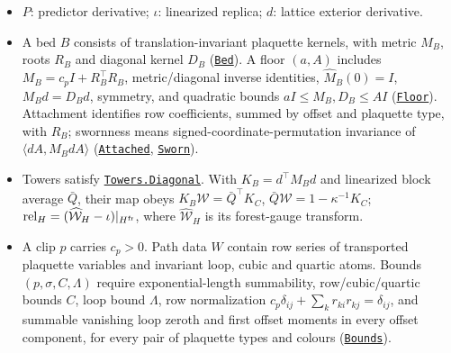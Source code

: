 \documentclass[
  letterpaper,
  11pt]{article}
\providecommand{\tightlist}{%
  \setlength{\itemsep}{0pt}\setlength{\parskip}{0pt}}
\begin{document}
\begin{itemize}
\tightlist
\item
  \(P\): predictor derivative; \(\iota\): linearized replica; \(d\):
  lattice exterior derivative.
\item
  A bed \(B\) consists of translation-invariant plaquette kernels, with
  metric \(M_B\), roots \(R_B\) and diagonal kernel \(D_B\)
  (\href{https://github.com/yang-mills-group/OpenAI-YM-20261028/blob/3456e5e75cf8d4cd558955a5c7638fba2d68f464/YM/PREC/Stacks.lean\#L35-L40}{\texttt{Bed}}).
  A floor \((a,A)\) includes \(M_B=c_pI+R_B^\top R_B\), metric/diagonal
  inverse identities, \(\widehat M_B(0)=I\), \(M_Bd=D_Bd\), symmetry,
  and quadratic bounds \(aI\le M_B,D_B\le AI\)
  (\href{https://github.com/yang-mills-group/OpenAI-YM-20261028/blob/3456e5e75cf8d4cd558955a5c7638fba2d68f464/YM/PREC/Stacks.lean\#L61-L68}{\texttt{Floor}}).
  Attachment identifies row coefficients, summed by offset and plaquette
  type, with \(R_B\); swornness means signed-coordinate-permutation
  invariance of \(\langle dA,M_BdA\rangle\)
  (\href{https://github.com/yang-mills-group/OpenAI-YM-20261028/blob/3456e5e75cf8d4cd558955a5c7638fba2d68f464/YM/PREC/Stacks.lean\#L44-L46}{\texttt{Attached}},
  \href{https://github.com/yang-mills-group/OpenAI-YM-20261028/blob/3456e5e75cf8d4cd558955a5c7638fba2d68f464/YM/Bid/Station.lean\#L54-L55}{\texttt{Sworn}}).
\item
  Towers satisfy
  \href{https://github.com/yang-mills-group/OpenAI-YM-20261028/blob/3456e5e75cf8d4cd558955a5c7638fba2d68f464/YM/PREC/Stacks.lean\#L82-L86}{\texttt{Towers.Diagonal}}.
  With \(K_B=d^\top M_Bd\) and linearized block average \(\bar Q\),
  their map obeys \(K_B\mathcal W=\bar Q^\top K_C\),
  \(\bar Q\mathcal W=1-\kappa^{-1}K_C\);
  \(\mathrm{rel}_H=(\widehat{\mathcal W}_H-\iota)|_{H^{\rm fr}}\), where
  \(\widehat{\mathcal W}_H\) is its forest-gauge transform.
\item
  A clip \(p\) carries \(c_p>0\). Path data \(W\) contain row series of
  transported plaquette variables and invariant loop, cubic and quartic
  atoms. Bounds \((p,\sigma,C,\Lambda)\) require exponential-length
  summability, row/cubic/quartic bounds \(C\), loop bound \(\Lambda\),
  row normalization \(c_p\delta_{ij}+\sum_k r_{ki}r_{kj}=\delta_{ij}\),
  and summable vanishing loop zeroth and first offset moments in every
  offset component, for every pair of plaquette types and colours
  (\href{https://github.com/yang-mills-group/OpenAI-YM-20261028/blob/3456e5e75cf8d4cd558955a5c7638fba2d68f464/YM/RG/PathActions.lean\#L173-L185}{\texttt{Bounds}}).

\end{itemize}
\end{document}
